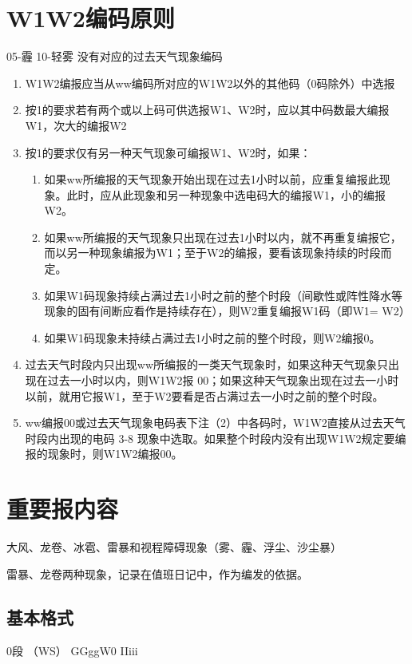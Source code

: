 ﻿\documentclass[UTF8,11pt]{ctexbook}%
\begin{document}
\section{W1W2编码原则}

05-霾 10-轻雾 没有对应的过去天气现象编码
\begin{enumerate}
	\item W1W2编报应当从ww编码所对应的W1W2以外的其他码（0码除外）中选报
	\item 按1的要求若有两个或以上码可供选报W1、W2时，应以其中码数最大编报W1，次大的编报W2
	\item 按1的要求仅有另一种天气现象可编报W1、W2时，如果：
	\begin{enumerate}
		\item 如果ww所编报的天气现象开始出现在过去1小时以前，应重复编报此现象。此时，应从此现象和另一种现象中选电码大的编报W1，小的编报W2。
		\item 如果ww所编报的天气现象只出现在过去1小时以内，就不再重复编报它，而以另一种现象编报为W1；至于W2的编报，要看该现象持续的时段而定。
		\item 如果W1码现象持续占满过去1小时之前的整个时段（间歇性或阵性降水等现象的固有间断应看作是持续存在），则W2重复编报W1码（即W1= W2）
		\item 如果W1码现象未持续占满过去1小时之前的整个时段，则W2编报0。
	\end{enumerate}
	\item 过去天气时段内只出现ww所编报的一类天气现象时，如果这种天气现象只出现在过去一小时以内，则W1W2报 00；如果这种天气现象出现在过去一小时以前，就用它报W1，至于W2要看是否占满过去一小时之前的整个时段。
	\item ww编报00或过去天气现象电码表下注（2）中各码时，W1W2直接从过去天气时段内出现的电码 3-8 现象中选取。如果整个时段内没有出现W1W2规定要编报的现象时，则W1W2编报00。 
\end{enumerate}

\section{重要报内容}

大风、龙卷、冰雹、雷暴和视程障碍现象（雾、霾、浮尘、沙尘暴）

雷暴、龙卷两种现象，记录在值班日记中，作为编发的依据。

\subsection{基本格式}

0段		（WS）		GGggW0    	IIiii
\end{document}
